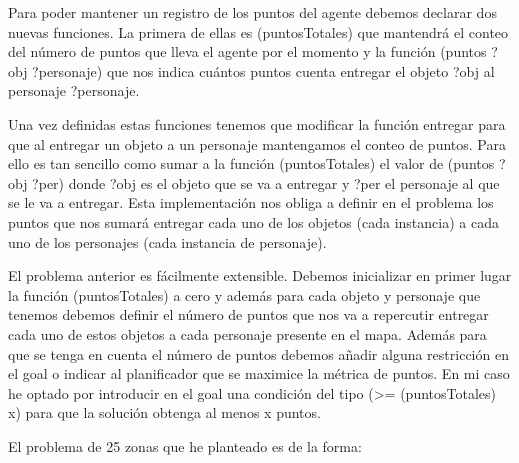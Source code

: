 \documentclass[12pt,a4paper]{article}
\begin{document}
Para poder mantener un registro de los puntos del agente debemos declarar dos nuevas funciones. La primera de ellas es (puntosTotales) que mantendrá el conteo del número de puntos que lleva el agente por el momento y la función (puntos ?obj ?personaje) que nos indica cuántos puntos cuenta entregar el objeto ?obj al personaje ?personaje.

Una vez definidas estas funciones tenemos que modificar la función entregar para que al entregar un objeto a un personaje mantengamos el conteo de puntos. Para ello es tan sencillo como sumar a la función (puntosTotales) el valor de (puntos ?obj ?per) donde ?obj es el objeto que se va a entregar y ?per el personaje al que se le va a entregar. Esta implementación nos obliga a definir en el problema los puntos que nos sumará entregar cada uno de los objetos (cada instancia) a cada uno de los personajes (cada instancia de personaje).

El problema anterior es fácilmente extensible. Debemos inicializar en primer lugar la función (puntosTotales) a cero y además para cada objeto y personaje que tenemos debemos definir el número de puntos que nos va a repercutir entregar cada uno de estos objetos a cada personaje presente en el mapa. Además para que se tenga en cuenta el número de puntos debemos añadir alguna restricción en el goal o indicar al planificador que se maximice la métrica de puntos. En mi caso he optado por introducir en el goal una condición del tipo (>= (puntosTotales) x) para que la solución obtenga al menos x puntos.

El problema de 25 zonas que he planteado es de la forma:





\end{document}
